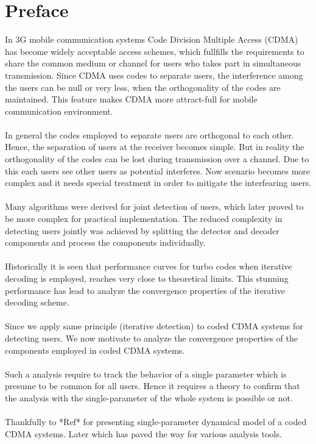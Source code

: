 \chapter{Preface}
In 3G mobile communication systems Code Division Multiple Access (CDMA) has become widely acceptable access schemes, which fullfills the requirements to share the common medium or channel for users who takes part in simultaneous transmission. Since CDMA uses codes to separate users, the interference among the users can be null or very less, when the orthogonality of the codes are maintained. This feature makes CDMA more attract-full for mobile communication environment. \\ \\
In general the codes employed to separate users are orthogonal to each other. Hence, the separation of users at the receiver becomes simple. But in reality the orthogonality of the codes can be lost during transmission over a channel. Due to this each users see other users as potential interferes. Now scenario becomes more complex and it needs special treatment in order to mitigate the interfearing users. \\ \\
Many algorithms were derived for joint detection of users, which later proved to be more complex for practical implementation. The reduced complexity in detecting users jointly was achieved by splitting the detector and decoder components and process the components individually. \\ \\
Historically it is seen that performance curves for turbo codes when iterative decoding is employed, reaches very close to theoretical limits. This stunning performance has lead to analyze the convergence properties of the iterative decoding scheme.\\ \\
Since we apply same principle (iterative detection) to coded CDMA systems for detecting users. We now motivate to analyze the convergence properties of the components employed in coded CDMA systems. \\ \\
Such a analysis require to track the behavior of a single parameter which is presume to be common for all users. Hence it requires a theory to confirm that the analysis with the single-parameter of the whole system is possible or not. \\ \\
Thankfully to *Ref* for presenting single-parameter dynamical model of a coded CDMA systems. Later which has paved the way for various analysis tools. \\ \\
